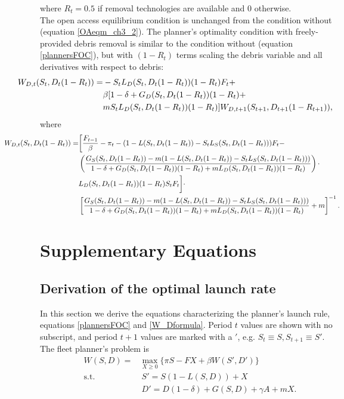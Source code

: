 \documentclass[9pt,twoside,lineno]{pnas-new}
\begin{document}
where $R_t = 0.5$ if removal technologies are available and $0$ otherwise.  \\

The open access equilibrium condition is unchanged from the condition without (equation \ref{OAeqm_ch3_2}). The planner's optimality condition with freely-provided debris removal is similar to the condition without (equation \ref{plannersFOC}), but with $(1-R_t)$ terms scaling the debris variable and all derivatives with respect to debris:
\begin{align}
\hspace{-1.25cm}	W_{D,t}(S_t,D_t(1-R_t)) =& - S_t L_D(S_t,D_t(1-R_t))(1-R_t) F_t + \nonumber \\
& \beta [1 - \delta + G_D(S_t,D_t(1-R_t))(1-R_t) + \nonumber \\
& m S_tL_D(S_t,D_t(1-R_t))(1-R_t)] W_{D,t+1}(S_{t+1},D_{t+1}(1-R_{t+1})),
\end{align}
where
\begin{align}
\hspace{-1.75cm}	W_{D,t}(S_t,D_t(1-R_t)) =& \bigg[ \frac{F_{t-1}}{\beta} - \pi_t - (1 - L(S_t,D_t(1-R_t)) - S_t L_S(S_t,D_t(1-R_t)))F_t - \nonumber \\
& \left( \frac{G_S(S_t,D_t(1-R_t)) - m(1 - L(S_t,D_t(1-R_t)) - S_tL_S(S_t,D_t(1-R_t)))}{1 - \delta + G_D(S_t,D_t(1-R_t))(1-R_t) + m L_D(S_t,D_t(1-R_t))(1-R_t)} \right) \cdot \nonumber \\
& L_D(S_t,D_t(1-R_t))(1-R_t) S_t F_t  \bigg] \cdot \nonumber \\
& \left[ \frac{G_S(S_t,D_t(1-R_t)) - m(1 - L(S_t,D_t(1-R_t)) - S_tL_S(S_t,D_t(1-R_t)))}{1 - \delta + G_D(S_t,D_t(1-R_t))(1-R_t) + m L_D(S_t,D_t(1-R_t))(1-R_t)} + m \right]^{-1}.
\end{align}

\section{Supplementary Equations}

\subsection{Derivation of the optimal launch rate}

In this section we derive the equations characterizing the planner's launch rule, equations \ref{plannersFOC} and \ref{W_Dformula}. Period $t$ values are shown with no subscript, and period $t+1$ values are marked with a $'$, e.g. $S_t \equiv S, S_{t+1} \equiv S'$. %
The fleet planner's problem is
\begin{align}
W(S,D) =& \max_{X \geq 0} \{ \pi S - F X + \beta W(S',D') \} \\
\text{s.t. } & ~ S' = S(1-L(S,D)) + X \\
& ~ D' = D (1-\delta) + G(S,D) + \gamma A + m X .
\end{align}
\end{document}
